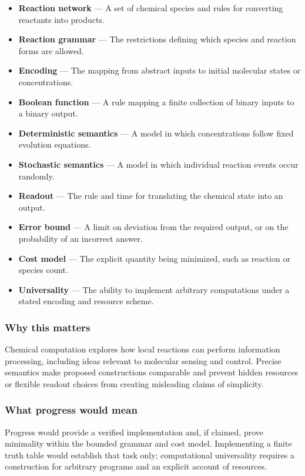 \documentclass[
  11pt,
]{article}
\begin{document}
\begin{itemize}
\item
  \textbf{Reaction network} --- A set of chemical species and rules for
  converting reactants into products.
\item
  \textbf{Reaction grammar} --- The restrictions defining which species
  and reaction forms are allowed.
\item
  \textbf{Encoding} --- The mapping from abstract inputs to initial
  molecular states or concentrations.
\item
  \textbf{Boolean function} --- A rule mapping a finite collection of
  binary inputs to a binary output.
\item
  \textbf{Deterministic semantics} --- A model in which concentrations
  follow fixed evolution equations.
\item
  \textbf{Stochastic semantics} --- A model in which individual reaction
  events occur randomly.
\item
  \textbf{Readout} --- The rule and time for translating the chemical
  state into an output.
\item
  \textbf{Error bound} --- A limit on deviation from the required
  output, or on the probability of an incorrect answer.
\item
  \textbf{Cost model} --- The explicit quantity being minimized, such as
  reaction or species count.
\item
  \textbf{Universality} --- The ability to implement arbitrary
  computations under a stated encoding and resource scheme.
\end{itemize}

\subsubsection{Why this matters}

Chemical computation explores how local reactions can perform
information processing, including ideas relevant to molecular sensing
and control. Precise semantics make proposed constructions comparable
and prevent hidden resources or flexible readout choices from creating
misleading claims of simplicity.

\subsubsection{What progress would mean}

Progress would provide a verified implementation and, if claimed, prove
minimality within the bounded grammar and cost model. Implementing a
finite truth table would establish that task only; computational
universality requires a construction for arbitrary programs and an
explicit account of resources.
\end{document}
